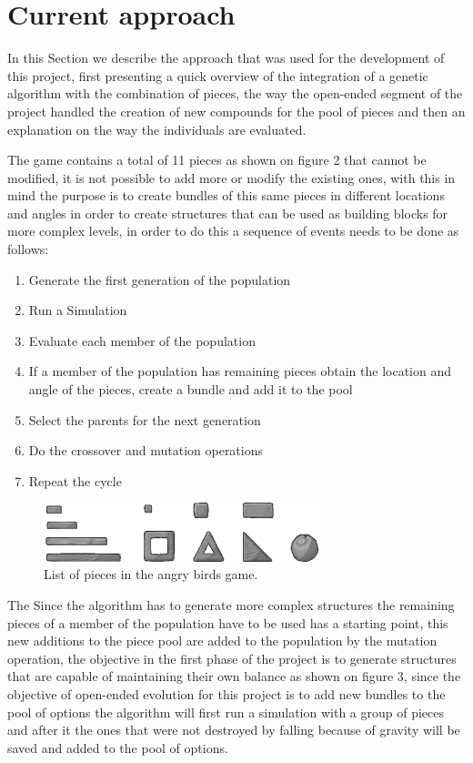 \documentclass[graybox]{svmult}
\begin{document}
\section{Current approach}

In this Section we describe the approach that was used for the development of this project, first presenting a quick overview of the integration of a genetic algorithm with the combination of pieces, the way the open-ended segment of the project handled the creation of new compounds for the pool of pieces and then an explanation on the way the individuals are evaluated.

The game contains a total of 11 pieces as shown on figure 2 that cannot be modified, it is not possible to add more or modify the existing ones, with this in mind the purpose is to create bundles of this same pieces in different locations and angles in order to create structures that can be used as building blocks for more complex levels, in order to do this a sequence of events needs to be done as follows:

\begin{enumerate}
\item Generate the first generation of the population
\item Run a Simulation
\item Evaluate each member of the population
\item If a member of the population has remaining pieces obtain the location and angle of the pieces, create a bundle and add it to the pool
\item Select the parents for the next generation
\item Do the crossover and mutation operations
\item Repeat the cycle
\end{enumerate}

\begin{figure}[htbp]
\centerline{\includegraphics[width=80mm]{Images/list_pieces.png}}
\caption{List of pieces in the angry birds game.}
\label{fig}
\end{figure}

The Since the algorithm has to generate more complex structures the remaining pieces of a member of the population have to be used has a starting point, this new additions to the piece pool are added to the population by the mutation operation, the objective in the first phase of the project is to generate structures that are capable of maintaining their own balance as shown on figure 3, since the objective of open-ended evolution for this project is to add new bundles to the pool of options the algorithm will first run a simulation with a group of pieces and after it the ones that were not destroyed by falling because of gravity will be saved and added to the pool of options.
\end{document}
